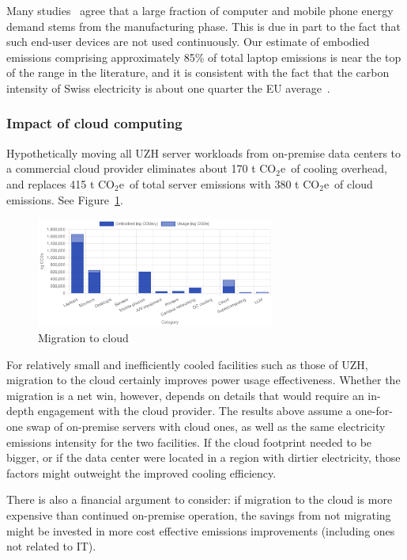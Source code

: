 \documentclass[11pt]{article}
\newcommand{\coe}{CO$_2$e}
\newcommand{\tcoe}{t \coe}
\begin{document}
Many studies~\cite{wb:itu:ict,umich:factsheet} agree that a large fraction of computer and mobile phone energy demand stems from the manufacturing phase. This is due in part to the fact that such end-user devices are not used continuously. Our estimate of embodied emissions comprising approximately 85\% of total laptop emissions is near the top of the range in the literature, and it is consistent with the fact that the carbon intensity of Swiss electricity is about one quarter the EU average~\cite{electricitymaps}.

\subsubsection*{Impact of cloud computing}

Hypothetically moving all UZH server workloads from on-premise data centers to a commercial cloud provider eliminates about 170 \tcoe\ of cooling overhead, and replaces 415 \tcoe\ of total server emissions with 380 \tcoe\ of cloud emissions. See Figure~\ref{fig:cloud}.

\begin{figure}[h]
  \centering
  \includegraphics[width=0.7\textwidth]{fig-cloud.png}
  \caption{Migration to cloud}
  \label{fig:cloud}
\end{figure}

For relatively small and inefficiently cooled facilities such as those of UZH, migration to the cloud certainly improves power usage effectiveness. Whether the migration is a net win, however, depends on details that would require an in-depth engagement with the cloud provider. The results above assume a one-for-one swap of on-premise servers with cloud ones, as well as the same electricity emissions intensity for the two facilities. If the cloud footprint needed to be bigger, or if the data center were located in a region with dirtier electricity, those factors might outweight the improved cooling efficiency.

There is also a financial argument to consider: if migration to the cloud is more expensive than continued on-premise operation, the savings from not migrating might be invested in more cost effective emissions improvements (including ones not related to IT).
\end{document}
